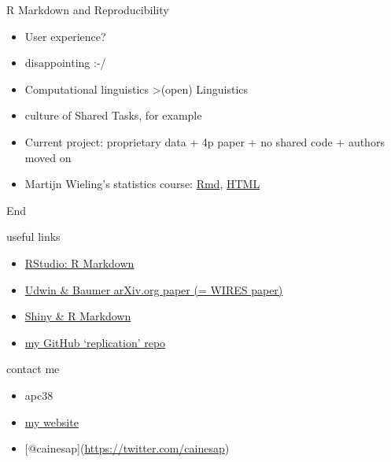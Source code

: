 \begin{frame}{R Markdown and Reproducibility}

\begin{itemize}[<+->]
\itemsep1pt\parskip0pt
\item
  User experience?
\item
  disappointing :-/
\item
  Computational linguistics \textgreater{}(open) Linguistics
\item
  culture of Shared Tasks, for example
\item
  Current project: proprietary data + 4p paper + no shared code +
  authors moved on
\item
  Martijn Wieling's statistics course:
  \href{http://www.let.rug.nl/~wieling/statscourse/lecture3/lab/answers/lab-including-answers.Rmd}{Rmd},
  \href{http://www.let.rug.nl/~wieling/statscourse/lecture3/lab/answers/lab-including-answers.html}{HTML}
\end{itemize}

\end{frame}

\begin{frame}{End}

\begin{block}{useful links}

\begin{itemize}
\itemsep1pt\parskip0pt
\item
  \href{http://rmarkdown.rstudio.com/}{RStudio: R Markdown}
\item
  \href{http://arxiv.org/abs/1501.01613}{Udwin \& Baumer arXiv.org paper
  (= WIRES paper)}
\item
  \href{http://shiny.rstudio.com/articles/interactive-docs.html}{Shiny
  \& R Markdown}
\item
  \href{https://github.com/cainesap/replication}{my GitHub `replication'
  repo}
\end{itemize}

\end{block}

\begin{block}{contact me}

\begin{itemize}
\itemsep1pt\parskip0pt
\item
  apc38
\item
  \href{http://apc38.user.srcf.net/}{my website}
\item
  {[}@cainesap{]}(\url{https://twitter.com/cainesap})
\end{itemize}

\end{block}

\end{frame}
